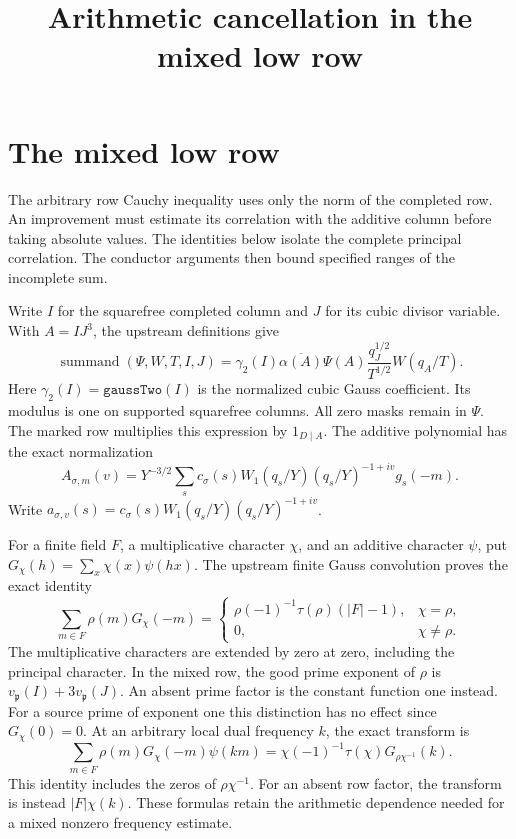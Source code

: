 \documentclass[11pt]{article}
\title{Arithmetic cancellation in the mixed low row}
\author{}
\date{}
\begin{document}
\maketitle

\section{The mixed low row}

The arbitrary row Cauchy inequality uses only the norm of the completed
row. An improvement must estimate its correlation with the additive
column before taking absolute values. The identities below isolate the
complete principal correlation. The conductor arguments then bound
specified ranges of the incomplete sum.

Write $I$ for the squarefree completed column and $J$ for its cubic divisor
variable. With $A=IJ^3$, the upstream definitions give
\[
 \operatorname{summand}(\Psi,W,T,I,J)
 =\gamma_2(I)\overline{\alpha(A)}\Psi(A)
       \frac{q_J^{1/2}}{T^{1/2}}W(q_A/T).
\]
Here $\gamma_2(I)=\texttt{gaussTwo}(I)$ is the normalized cubic Gauss coefficient. Its modulus
is one on supported squarefree columns. All zero masks remain in $\Psi$.
The marked row multiplies this expression by $1_{D\mid A}$.
The additive polynomial has the exact normalization
\[
 A_{\sigma,m}(v)=Y^{-3/2}\sum_s c_\sigma(s)
       W_1(q_s/Y)(q_s/Y)^{-1+iv}g_s(-m).
\]
Write $a_{\sigma,v}(s)=c_\sigma(s)W_1(q_s/Y)(q_s/Y)^{-1+iv}$.

For a finite field $F$, a multiplicative character $\chi$, and an additive
character $\psi$, put $G_\chi(h)=\sum_x\chi(x)\psi(hx)$.
The upstream finite Gauss convolution proves the exact identity
\[
 \sum_{m\in F}\rho(m)G_\chi(-m)
 =\begin{cases}
   \rho(-1)^{-1}\tau(\rho)(|F|-1),&\chi=\rho,\\
   0,&\chi\ne\rho.
  \end{cases}
\]
The multiplicative characters are extended by zero at zero, including
the principal character. In the mixed row, the good prime exponent of
$\rho$ is $v_{\mathfrak p}(I)+3v_{\mathfrak p}(J)$.
An absent prime factor is the constant function one instead. For a source
prime of exponent one this distinction has no effect since $G_\chi(0)=0$.
At an arbitrary local dual frequency $k$, the exact transform is
\[
 \sum_{m\in F}\rho(m)G_\chi(-m)\psi(km)
   =\chi(-1)^{-1}\tau(\chi)G_{\rho\chi^{-1}}(k).
\]
This identity includes the zeros of $\rho\chi^{-1}$.
For an absent row factor, the transform is instead $|F|\chi(k)$.
These formulas retain the arithmetic dependence needed for a mixed
nonzero frequency estimate.
\end{document}
